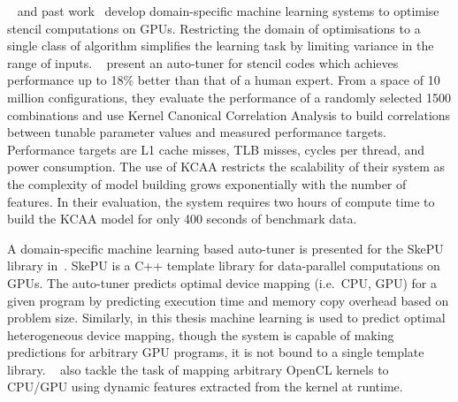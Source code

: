 %
\citeauthor{Lutz2013}~\cite{Lutz2013} and past work~\cite{Cummins2016a} develop domain-specific machine learning systems to optimise stencil computations on GPUs. Restricting the domain of optimisations to a single class of algorithm simplifies the learning task by limiting variance in the range of inputs.
\citeauthor{Ganapathi2009}~\cite{Ganapathi2009} present an auto-tuner for stencil codes which achieves performance up to 18\% better than that of a human expert. From a space of 10 million configurations, they evaluate the performance of a randomly selected 1500 combinations and use Kernel Canonical Correlation Analysis to build correlations between tunable parameter values and measured performance targets. Performance targets are L1 cache misses, TLB misses, cycles per thread, and power consumption. The use of KCAA restricts the scalability of their system as the complexity of model building grows exponentially with the number of features. In their evaluation, the system requires two hours of compute time to build the KCAA model for only 400 seconds of benchmark data.

A domain-specific machine learning based auto-tuner is presented for the SkePU library in~\cite{Dastgeer2011b}. SkePU is a C++ template library for data-parallel computations on GPUs. The auto-tuner predicts optimal device mapping (i.e.\ CPU, GPU) for a given program by predicting execution time and memory copy overhead based on problem size. Similarly, in this thesis machine learning is used to predict optimal heterogeneous device mapping, though the system is capable of making predictions for arbitrary GPU programs, it is not bound to a single template library.
\citeauthor{Moren2018}~\cite{Moren2018} also tackle the task of mapping arbitrary OpenCL kernels to CPU/GPU using dynamic features extracted from the kernel at runtime.

